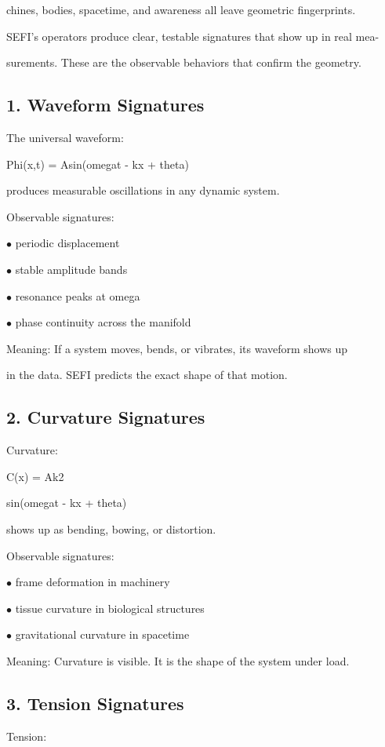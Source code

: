 \documentclass[10pt]{article}
\begin{document}
chines, bodies, spacetime, and awareness all leave geometric fingerprints.

SEFI's operators produce clear, testable signatures that show up in real mea-

surements. These are the observable behaviors that confirm the geometry.

\subsection*{1. Waveform Signatures}
The universal waveform:

Phi(x,t) = Asin(omegat - kx + theta)

produces measurable oscillations in any dynamic system.

Observable signatures:

\noindent $\bullet$ periodic displacement

\noindent $\bullet$ stable amplitude bands

\noindent $\bullet$ resonance peaks at omega

\noindent $\bullet$ phase continuity across the manifold

Meaning: If a system moves, bends, or vibrates, its waveform shows up

in the data. SEFI predicts the exact shape of that motion.

\subsection*{2. Curvature Signatures}
Curvature:

C(x) = Ak2

sin(omegat - kx + theta)

shows up as bending, bowing, or distortion.

Observable signatures:


\noindent $\bullet$ frame deformation in machinery

\noindent $\bullet$ tissue curvature in biological structures

\noindent $\bullet$ gravitational curvature in spacetime

Meaning: Curvature is visible. It is the shape of the system under load.

\subsection*{3. Tension Signatures}
Tension:
\end{document}
